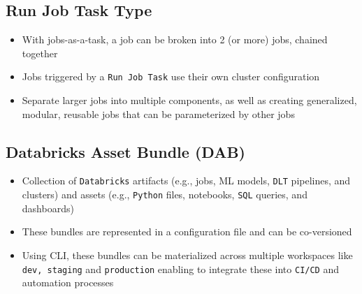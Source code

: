 \documentclass[11pt]{scrartcl}
\begin{document}
\subsection{Run Job Task Type}
\begin{itemize}
	\item With jobs-as-a-task, a job can be broken into 2 (or more) jobs, chained together
	\item Jobs triggered by a \texttt{Run Job Task} use their own cluster configuration
	\item Separate larger jobs into multiple components, as well as creating generalized, modular, reusable jobs that can be parameterized by other jobs
\end{itemize}

\subsection{Databricks Asset Bundle (DAB)} \label{dab}
\begin{itemize}
	\item Collection of \texttt{Databricks} artifacts (e.g., jobs, ML models, \texttt{DLT} pipelines, and clusters) and assets (e.g., \texttt{Python} files, notebooks, \texttt{SQL} queries, and dashboards)
	\item These bundles are represented in a configuration file and can be co-versioned
	\item Using CLI, these bundles can be materialized across multiple workspaces like \texttt{dev, staging} and \texttt{production} enabling to integrate these into \texttt{CI/CD} and automation processes
\end{itemize}
\end{document}
